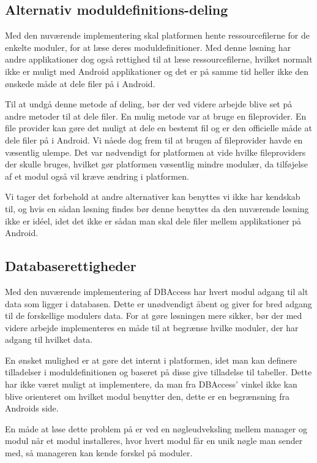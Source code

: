 \subsection{Alternativ moduldefinitions-deling}
Med den nuværende implementering skal platformen hente ressourcefilerne for de enkelte moduler, for at læse deres moduldefinitioner.
Med denne løsning har andre applikationer dog også rettighed til at læse ressourcefilerne, hvilket normalt ikke er muligt med Android applikationer og det er på samme tid heller ikke den ønskede måde at dele filer på i Android.

Til at undgå denne metode af deling, bør der ved videre arbejde blive set på andre metoder til at dele filer.
En mulig metode var at bruge en fileprovider.
En file provider kan gøre det muligt at dele en bestemt fil og er den officielle måde at dele filer på i Android.
Vi nåede dog frem til at brugen af fileprovider havde en væsentlig ulempe.
Det var nødvendigt for platformen at vide hvilke fileproviders der skulle bruges, hvilket gør platformen væsentlig mindre modulær, da tilføjelse af et modul også vil kræve ændring i platformen.

Vi tager det forbehold at andre alternativer kan benyttes vi ikke har kendskab til, og hvis en sådan løsning findes bør denne benyttes da den nuværende løsning ikke er idéel, idet det ikke er sådan man skal dele filer mellem applikationer på Android.

\subsection{Databaserettigheder}\label{databaserettigheder}
Med den nuværende implementering af DBAccess har hvert modul adgang til alt data som ligger i databasen.
Dette er unødvendigt åbent og giver for bred adgang til de forskellige modulers data.
For at gøre løsningen mere sikker, bør der med videre arbejde implementeres en måde til at begrænse hvilke moduler, der har adgang til hvilket data.

En ønsket mulighed er at gøre det internt i platformen, idet man kan definere tilladelser i moduldefinitionen og baseret på disse give tilladelse til tabeller. 
Dette har ikke været muligt at implementere, da man fra DBAccess' vinkel ikke kan blive orienteret om hvilket modul benytter den, dette er en begrænsning fra Androids side.

En måde at løse dette problem på er ved en nøgleudveksling mellem manager og modul når et modul installeres, hvor hvert modul får en unik nøgle man sender med, så manageren kan kende forskel på moduler.


